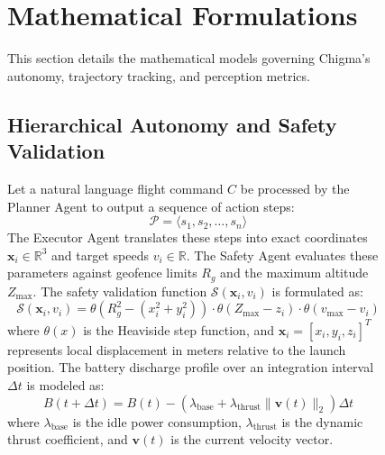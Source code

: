 \documentclass[conference]{IEEEtran}
\begin{document}
\begin{figure}[t]
\section{Mathematical Formulations}
This section details the mathematical models governing Chigma's autonomy, trajectory tracking, and perception metrics.

\subsection{Hierarchical Autonomy and Safety Validation}
Let a natural language flight command $C$ be processed by the Planner Agent to output a sequence of action steps:
\begin{equation}
\mathcal{P} = \langle s_1, s_2, \dots, s_n \rangle
\end{equation}
The Executor Agent translates these steps into exact coordinates $\mathbf{x}_i \in \mathbb{R}^3$ and target speeds $v_i \in \mathbb{R}$. The Safety Agent evaluates these parameters against geofence limits $R_g$ and the maximum altitude $Z_{\text{max}}$. The safety validation function $\mathcal{S}(\mathbf{x}_i, v_i)$ is formulated as:
\begin{equation}
\mathcal{S}(\mathbf{x}_i, v_i) = \theta(R_g^2 - (x_i^2 + y_i^2)) \cdot \theta(Z_{\text{max}} - z_i) \cdot \theta(v_{\text{max}} - v_i)
\end{equation}
where $\theta(x)$ is the Heaviside step function, and $\mathbf{x}_i = [x_i, y_i, z_i]^T$ represents local displacement in meters relative to the launch position. The battery discharge profile over an integration interval $\Delta t$ is modeled as:
\begin{equation}
B(t + \Delta t) = B(t) - \left( \lambda_{\text{base}} + \lambda_{\text{thrust}} \|\mathbf{v}(t)\|_2 \right) \Delta t
\end{equation}
where $\lambda_{\text{base}}$ is the idle power consumption, $\lambda_{\text{thrust}}$ is the dynamic thrust coefficient, and $\mathbf{v}(t)$ is the current velocity vector.


\end{figure}
\end{document}

